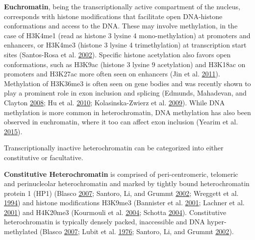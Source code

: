 \documentclass[onehalf,12pt]{beavtex}
\begin{document}
  \textbf{Euchromatin}, being the transcriptionally active compartment of
  the nucleus, corresponds with histone modifications that facilitate open
  DNA-histone conformations and access to the DNA. These may involve
  methylation, in the case of H3K4me1 (read as histone 3 lysine 4
  mono-methylation) at promoters and enhancers, or H3K4me3 (histone 3
  lysine 4 trimethylation) at transcription start sites (Santos-Rosa et
  al. \protect\hyperlink{ref-Santos-RosaActivegenesare2002}{2002}).
  Specific histone acetylation also favors open conformations, such as
  H3K9ac (histone 3 lysine 9 acetylation) and H3K18ac on promoters and
  H3K27ac more often seen on enhancers (Jin et al.
  \protect\hyperlink{ref-JinDistinctrolesGCN52011}{2011}). Methylation of
  H3K36me3 is often seen on gene bodies and was recently shown to play a
  prominent role in exon inclusion and splicing (Edmunds, Mahadevan, and
  Clayton \protect\hyperlink{ref-EdmundsDynamichistoneH32008a}{2008}; Hu
  et al. \protect\hyperlink{ref-HuHistoneH3lysine2010}{2010};
  Kolasinska-Zwierz et al.
  \protect\hyperlink{ref-Kolasinska-ZwierzDifferentialchromatinmarking2009}{2009}).
  While DNA methylation is more common in heterochromatin, DNA methylation
  has also been observed in euchromatin, where it too can affect exon
  inclusion (Yearim et al.
  \protect\hyperlink{ref-YearimHP1InvolvedRegulating2015}{2015}).
  
  Transcriptionally inactive heterochromatin can be categorized into
  either constitutive or facultative.
  
  \textbf{Constitutive Heterochromatin} is comprised of peri-centromeric,
  telomeric and perinucleolar heterochromatin and marked by tightly bound
  heterochromatin protein 1 (HP1) (Blasco
  \protect\hyperlink{ref-Blascoepigeneticregulationmammalian2007}{2007};
  Santoro, Li, and Grummt
  \protect\hyperlink{ref-Santoronucleolarremodelingcomplex2002}{2002};
  Wreggett et al.
  \protect\hyperlink{ref-WreggettmammalianhomologueDrosophila1994}{1994})
  and histone modifications H3K9me3 (Bannister et al.
  \protect\hyperlink{ref-BannisterSelectiverecognitionmethylated2001}{2001};
  Lachner et al.
  \protect\hyperlink{ref-LachnerMethylationhistoneH32001}{2001}) and
  H4K20me3 (Kourmouli et al.
  \protect\hyperlink{ref-KourmouliHeterochromatintrimethylatedlysine2004}{2004};
  Schotta
  \protect\hyperlink{ref-Schottasilencingpathwayinduce2004}{2004}).
  Constitutive heterochromatin is typically densely packed, inaccessible
  and DNA hyper-methylated (Blasco
  \protect\hyperlink{ref-Blascoepigeneticregulationmammalian2007}{2007};
  Lubit et al.
  \protect\hyperlink{ref-LubitLocalization5methylcytosinehuman1976}{1976};
  Santoro, Li, and Grummt
  \protect\hyperlink{ref-Santoronucleolarremodelingcomplex2002}{2002}).
  
\end{document}
